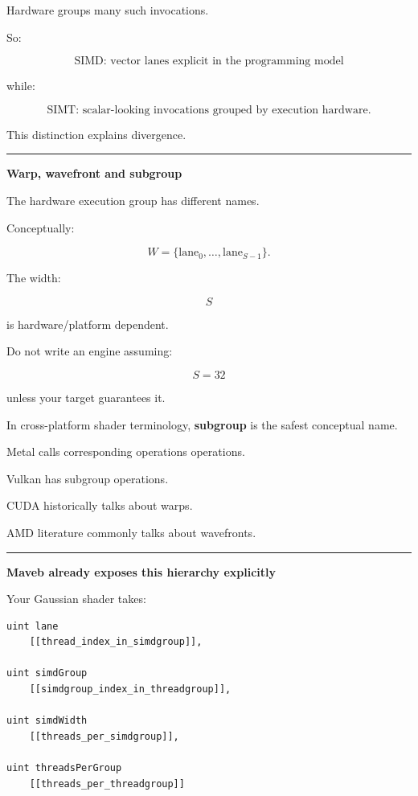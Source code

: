 Hardware groups many such invocations.

So:

\[
\boxed{
\text{SIMD: vector lanes explicit in the programming model}
}
\]

while:

\[
\boxed{
\text{SIMT: scalar-looking invocations grouped by execution hardware}.
}
\]

This distinction explains divergence.

\begin{center}\rule{0.5\linewidth}{0.5pt}\end{center}

\textbf{Warp, wavefront and subgroup}

The hardware execution group has different names.

Conceptually:

\[
\boxed{
W=\{\text{lane}_0,\dots,\text{lane}_{S-1}\}.
}
\]

The width:

\[
S
\]

is hardware/platform dependent.

Do not write an engine assuming:

\[
S=32
\]

unless your target guarantees it.

In cross-platform shader terminology, \textbf{subgroup} is the safest conceptual name.

Metal calls corresponding operations  operations.

Vulkan has subgroup operations.

CUDA historically talks about warps.

AMD literature commonly talks about wavefronts.

\begin{center}\rule{0.5\linewidth}{0.5pt}\end{center}

\textbf{Maveb already exposes this hierarchy explicitly}

Your Gaussian shader takes:

\protect{}\label{z8wxwy}%
\begin{verbatim}
uint lane
    [[thread_index_in_simdgroup]],

uint simdGroup
    [[simdgroup_index_in_threadgroup]],

uint simdWidth
    [[threads_per_simdgroup]],

uint threadsPerGroup
    [[threads_per_threadgroup]]
\end{verbatim}

